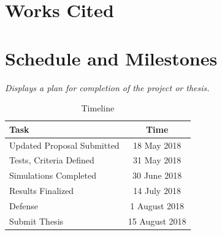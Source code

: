\documentclass {article}
\newcommand{\sechint}[1]{\small{\emph{#1}} \bigskip}
\begin{document}
\pagebreak
\section{Works Cited}
\printbibliography[title={\ }]

\pagebreak
\section{Schedule and Milestones}{\sechint{Displays a plan for completion of the project or thesis.}}

\begin{table}[!ht]
	\centering
	\begin{tabular}{l|c}
		\hline
		Task & Time \\ \hline \hline
		Updated Proposal Submitted & 18 May 2018 \\ \hline
		Tests, Criteria Defined & 31 May 2018 \\ \hline
		Simulations Completed & 30 June 2018 \\ \hline
		Results Finalized & 14 July 2018 \\ \hline
		Defense & 1 August 2018 \\ \hline
		Submit Thesis & 15 August 2018 \\ \hline
	\end{tabular}
	\caption{Timeline}
\end{table}
\end{document}
